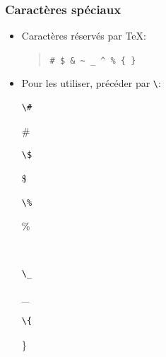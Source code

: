 \begin{frame}[fragile=singleslide]
  \frametitle{Caractères spéciaux}
  \begin{itemize}
  \item Caractères réservés par {\TeX}:
    \begin{quote}
      \verb=# $ & ~ _ ^ % { }=
    \end{quote}
  \item Pour les utiliser, précéder par \verb=\=:
    \begin{demo}
      \begin{minipage}{0.15\linewidth}
        \begin{texample}
\begin{lstlisting}
\#
\end{lstlisting}
          \producing
          \#
        \end{texample}
      \end{minipage}
      \hfill
      \begin{minipage}{0.15\linewidth}
        \begin{texample}
\begin{lstlisting}
\$
\end{lstlisting}
          \producing
          \$
        \end{texample}
      \end{minipage}
      \hfill
      \begin{minipage}{0.15\linewidth}
        \begin{texample}
\begin{lstlisting}
\%
\end{lstlisting}
          \producing
          \%
        \end{texample}
      \end{minipage}
      \\
      \begin{minipage}{0.15\linewidth}
        \begin{texample}
\begin{lstlisting}
\_
\end{lstlisting}
          \producing
          \_
        \end{texample}
      \end{minipage}
      \hfill
      \begin{minipage}{0.15\linewidth}
        \begin{texample}
\begin{lstlisting}
\{
\end{lstlisting}
          \producing
          \}

\end{texample}
\end{minipage}
\end{demo}
\end{itemize}
\end{frame}
